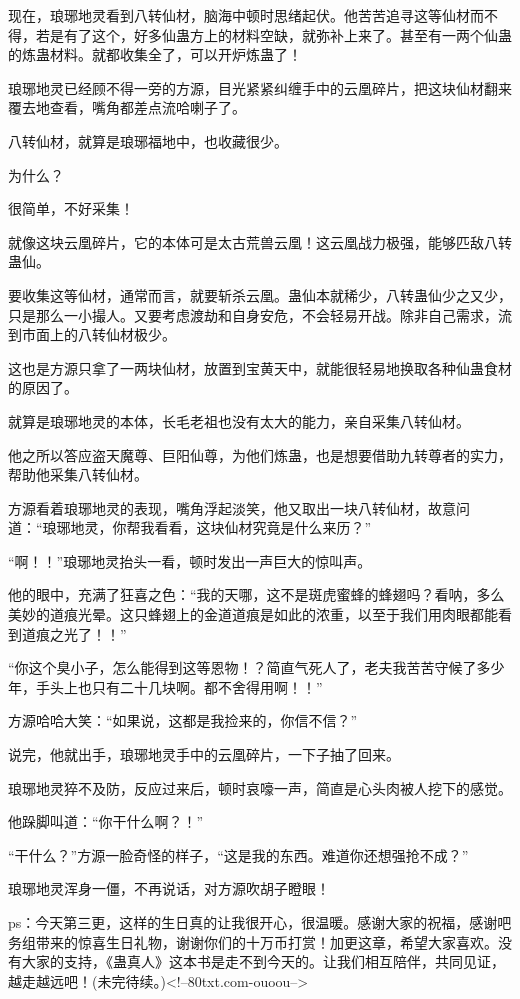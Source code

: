 \begin{this_body}
现在，琅琊地灵看到八转仙材，脑海中顿时思绪起伏。他苦苦追寻这等仙材而不得，若是有了这个，好多仙蛊方上的材料空缺，就弥补上来了。甚至有一两个仙蛊的炼蛊材料。就都收集全了，可以开炉炼蛊了！

琅琊地灵已经顾不得一旁的方源，目光紧紧纠缠手中的云凰碎片，把这块仙材翻来覆去地查看，嘴角都差点流哈喇子了。

八转仙材，就算是琅琊福地中，也收藏很少。

为什么？

很简单，不好采集！

就像这块云凰碎片，它的本体可是太古荒兽云凰！这云凰战力极强，能够匹敌八转蛊仙。

要收集这等仙材，通常而言，就要斩杀云凰。蛊仙本就稀少，八转蛊仙少之又少，只是那么一小撮人。又要考虑渡劫和自身安危，不会轻易开战。除非自己需求，流到市面上的八转仙材极少。

这也是方源只拿了一两块仙材，放置到宝黄天中，就能很轻易地换取各种仙蛊食材的原因了。

就算是琅琊地灵的本体，长毛老祖也没有太大的能力，亲自采集八转仙材。

他之所以答应盗天魔尊、巨阳仙尊，为他们炼蛊，也是想要借助九转尊者的实力，帮助他采集八转仙材。

方源看着琅琊地灵的表现，嘴角浮起淡笑，他又取出一块八转仙材，故意问道：“琅琊地灵，你帮我看看，这块仙材究竟是什么来历？”

“啊！！”琅琊地灵抬头一看，顿时发出一声巨大的惊叫声。

他的眼中，充满了狂喜之色：“我的天哪，这不是斑虎蜜蜂的蜂翅吗？看呐，多么美妙的道痕光晕。这只蜂翅上的金道道痕是如此的浓重，以至于我们用肉眼都能看到道痕之光了！！”

“你这个臭小子，怎么能得到这等恩物！？简直气死人了，老夫我苦苦守候了多少年，手头上也只有二十几块啊。都不舍得用啊！！”

方源哈哈大笑：“如果说，这都是我捡来的，你信不信？”

说完，他就出手，琅琊地灵手中的云凰碎片，一下子抽了回来。

琅琊地灵猝不及防，反应过来后，顿时哀嚎一声，简直是心头肉被人挖下的感觉。

他跺脚叫道：“你干什么啊？！”

“干什么？”方源一脸奇怪的样子，“这是我的东西。难道你还想强抢不成？”

琅琊地灵浑身一僵，不再说话，对方源吹胡子瞪眼！

ps：今天第三更，这样的生日真的让我很开心，很温暖。感谢大家的祝福，感谢吧务组带来的惊喜生日礼物，谢谢你们的十万币打赏！加更这章，希望大家喜欢。没有大家的支持，《蛊真人》这本书是走不到今天的。让我们相互陪伴，共同见证，越走越远吧！(未完待续。)<!--80txt.com-ouoou-->

\end{this_body}

